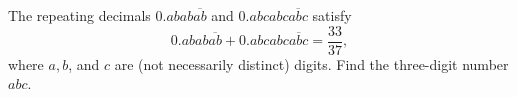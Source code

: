 The repeating decimals $0.abab\overline{ab}$ and $0.abcabc\overline{abc}$ satisfy
\[0.abab\overline{ab}+0.abcabc\overline{abc}=\frac{33}{37},\]
where $a,b$, and $c$ are (not necessarily distinct) digits. Find the three-digit number $abc$.